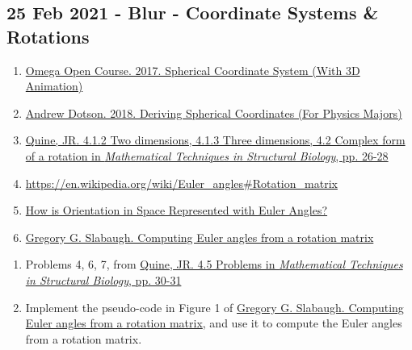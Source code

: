 \documentclass[11pt, oneside]{article}   	%
\begin{document}
\subsection{25 Feb 2021 - Blur - Coordinate Systems \& Rotations}
\begin{enumerate}
	\item \href{https://youtu.be/FDyenWWlPdU}{Omega Open Course. 2017. Spherical Coordinate System (With 3D Animation)}
	\item \href{https://youtu.be/w79nZGzWMyI}{Andrew Dotson. 2018. Deriving Spherical Coordinates (For Physics Majors)}
	\item \href{https://accio.github.io/AMIDD/assets/2020/04/JRQuine-MathBiophysicsBook.pdf}{Quine, JR. 4.1.2 Two dimensions, 4.1.3 Three dimensions, 4.2 Complex form of a rotation in {\it  Mathematical Techniques in Structural Biology},  pp. 26-28}
	\item \url{https://en.wikipedia.org/wiki/Euler_angles#Rotation_matrix}
	\item \href{https://www.mecademic.com/en/how-is-orientation-in-space-represented-with-euler-angles}{How is Orientation in Space Represented with Euler Angles?}
	\item \href{http://www.close-range.com/docs/Computing_Euler_angles_from_a_rotation_matrix.pdf}{Gregory G. Slabaugh. Computing Euler angles from a rotation matrix}
\end{enumerate}

\begin{enumerate}
	\item Problems 4, 6, 7, from \href{https://accio.github.io/AMIDD/assets/2020/04/JRQuine-MathBiophysicsBook.pdf}{Quine, JR. 4.5 Problems  in {\it  Mathematical Techniques in Structural Biology},  pp. 30-31}
	\item Implement the pseudo-code in Figure 1 of \href{http://www.close-range.com/docs/Computing_Euler_angles_from_a_rotation_matrix.pdf}{Gregory G. Slabaugh. Computing Euler angles from a rotation matrix}, and use it to compute the Euler angles from a rotation matrix.
\end{enumerate}
\end{document}
